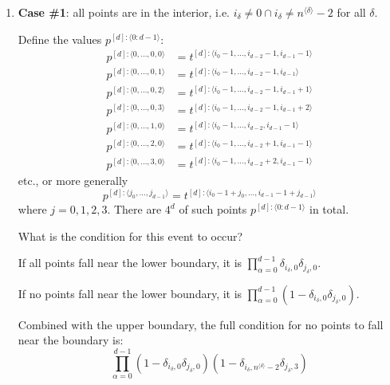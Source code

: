 \documentclass[11pt]{article}
\begin{document}
\begin{enumerate}
\item \textbf{Case \#1}: all points are in the interior, i.e. $i_\delta \neq 0 \cap i_\delta \neq n^{\langle \delta \rangle}-2$ for all $\delta$.

Define the values $p^{[d]: \langle 0:d-1 \rangle}$:
\begin{equation*}
\begin{split}
p^{[d]:\langle 0, \dots, 0,0 \rangle} &= t^{[d]:\langle i_0-1, \dots, i_{d-2}-1, i_{d-1}-1 \rangle} \\
p^{[d]:\langle 0, \dots, 0,1 \rangle} &= t^{[d]:\langle i_0-1, \dots, i_{d-2}-1, i_{d-1} \rangle} \\
p^{[d]:\langle 0, \dots, 0,2 \rangle} &= t^{[d]:\langle i_0-1, \dots, i_{d-2}-1, i_{d-1}+1 \rangle} \\
p^{[d]:\langle 0, \dots, 0,3 \rangle} &= t^{[d]:\langle i_0-1, \dots, i_{d-2}-1, i_{d-1}+2 \rangle} \\
p^{[d]:\langle 0, \dots, 1,0 \rangle} &= t^{[d]:\langle i_0-1, \dots, i_{d-2}, i_{d-1}-1 \rangle} \\
p^{[d]:\langle 0, \dots, 2,0 \rangle} &= t^{[d]:\langle i_0-1, \dots, i_{d-2}+1, i_{d-1}-1 \rangle} \\
p^{[d]:\langle 0, \dots, 3,0 \rangle} &= t^{[d]:\langle i_0-1, \dots, i_{d-2}+2, i_{d-1}-1 \rangle}
\end{split}
\end{equation*}
etc., or more generally
\begin{equation*}
p^{[d]:\langle j_0, \dots, j_{d-1} \rangle} = t^{[d]:\langle i_0-1+j_0, \dots, i_{d-1}-1+j_{d-1} \rangle} 
\end{equation*}
where $j=0,1,2,3$. There are $4^d$ of such points $p^{[d]: \langle 0:d-1 \rangle}$ in total.

What is the condition for this event to occur?

If all points fall near the lower boundary, it is $\prod_{\alpha = 0}^{d-1} \delta_{i_\delta,0} \delta_{j_\delta,0}$.

If no points fall near the lower boundary, it is $\prod_{\alpha = 0}^{d-1} (1 - \delta_{i_\delta,0} \delta_{j_\delta,0} )$.

Combined with the upper boundary, the full condition for no points to fall near the boundary is:
\begin{equation*}
\prod_{\alpha = 0}^{d-1} (1 - \delta_{i_\delta,0} \delta_{j_\delta,0} ) (1 - \delta_{i_\delta,n^{\langle \delta \rangle}-2} \delta_{j_\delta,3})
\end{equation*}


\end{enumerate}
\end{document}
